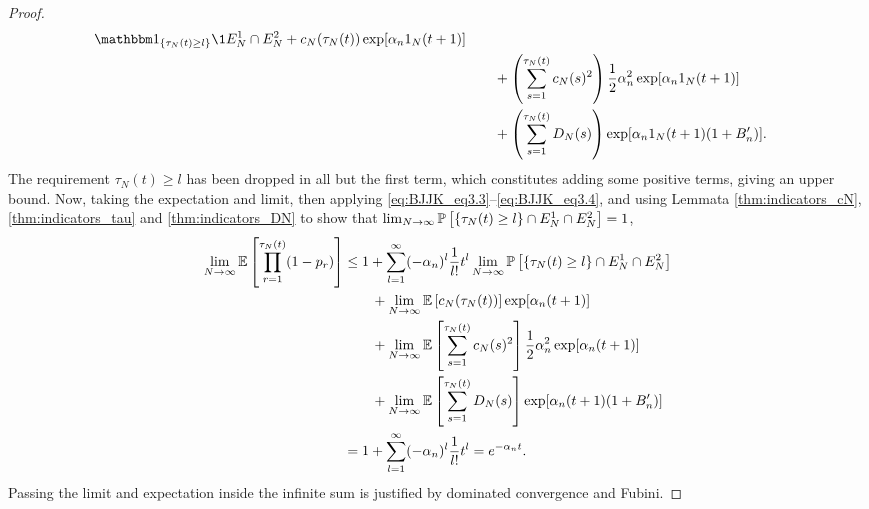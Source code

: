 \begin{proof}
\begin{align}
        \I{\tau_N(t) \geq l} \1{E_N^1 \cap E_N^2}
        + c_N(\tau_N(t)) \exp[ \alpha_n \ON (t+1) ] \notag\\
    &\qquad+ \left( \sum_{s=1}^{\tau_N(t)} c_N(s)^2 \right)
        \frac{1}{2} \alpha_n^2 \exp[ \alpha_n \ON (t+1) ] \notag\\
    &\qquad+ \left( \sum_{s=1}^{\tau_N(t)} D_N(s) \right)
        \exp[ \alpha_n \ON (t+1) (1+B_n^\prime) ] . \label{eq:021}
\end{align}
The requirement $\tau_N(t) \geq l$ has been dropped in all but the first term, which constitutes adding some positive terms, giving an upper bound.
Now, taking the expectation and limit, then applying \eqref{eq:BJJK_eq3.3}--\eqref{eq:BJJK_eq3.4}, and using Lemmata \ref{thm:indicators_cN}, \ref{thm:indicators_tau} and \ref{thm:indicators_DN} to show that $\lim_{N\to\infty} \mathbb{P} \left[ \{\tau_N(t) \geq l\} \cap E_N^1 \cap E_N^2 \right] =1$,
\begin{align}
\lim_{N\to\infty} \mathbb{E} \left[ \prod_{r=1}^{\tau_N(t)} (1-p_r) \right]
&\leq 1+ \sum_{l=1}^{\infty} (-\alpha_n)^l \frac{1}{l!} t^l
        \lim_{N\to\infty} \mathbb{P} \left[ \{\tau_N(t) \geq l\} \cap E_N^1 \cap E_N^2 \right] \notag\\
    &\qquad+ \lim_{N\to\infty} \mathbb{E} \left[ c_N(\tau_N(t)) \right]
        \exp[ \alpha_n (t+1) ] \notag\\
    &\qquad+ \lim_{N\to\infty} \mathbb{E} \left[ \sum_{s=1}^{\tau_N(t)} 
        c_N(s)^2 \right]
        \frac{1}{2} \alpha_n^2 \exp[ \alpha_n (t+1) ] \notag\\
    &\qquad+ \lim_{N\to\infty} \mathbb{E} \left[ \sum_{s=1}^{\tau_N(t)} D_N(s) \right]
        \exp[ \alpha_n (t+1) (1+B_n^\prime) ] \notag\\
&= 1+ \sum_{l=1}^{\infty} (-\alpha_n)^l \frac{1}{l!} t^l
= e^{-\alpha_n t}. \label{eq:022}
\end{align}
Passing the limit and expectation inside the infinite sum is justified by dominated convergence and Fubini.


\end{proof}
